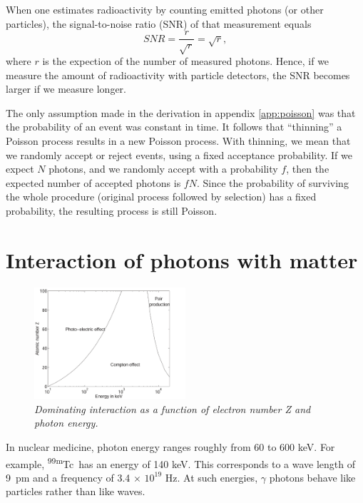 \documentclass[11pt,oneside]{book}
\begin{document}
When one estimates radioactivity by counting emitted photons (or other
particles), the signal-to-noise ratio (SNR) of that measurement equals
\begin{equation}
 SNR = \frac{r}{\sqrt{r}} = \sqrt{r},
\end{equation}
where $r$ is the expection of the number of measured photons.  Hence,
if we measure the amount of radioactivity with particle detectors, the
SNR becomes larger if we measure longer.

The only assumption made in the derivation in appendix
\ref{app:poisson} was that the probability of an event was constant in
time. It follows that ``thinning'' a Poisson process results in a new
Poisson process. With thinning, we mean that we randomly accept or
reject events, using a fixed acceptance probability. If we expect $N$
photons, and we randomly accept with a probability $f$, then the
expected number of accepted photons is $fN$. Since the probability of
surviving the whole procedure (original process followed by selection)
has a fixed probability, the resulting process is still Poisson.

\chapter{Interaction of photons with matter}

\begin{figure}[tb]
\centering
\includegraphics[width = 0.5\textwidth]{figs/fig_foto_compton_pair.pdf}
\caption{\label{fig:foto_compton_pair} \emph{Dominating interaction as a
function of electron number Z and photon energy.}}
\end{figure}

In nuclear medicine, photon energy ranges roughly from 60 to 600 keV. For
example, \textsuperscript{99m}Tc\ has an energy of 140 keV. This corresponds to a wave
length of 9~pm and a frequency of 3.4 $\times$ $10^{19}$ Hz. At such energies,
$\gamma$ photons behave like particles rather than like waves.
\end{document}
